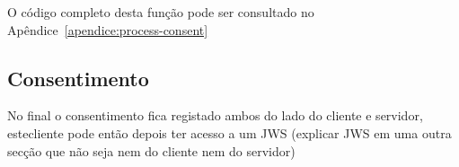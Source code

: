 O código completo desta função pode ser consultado no Apêndice~\ref{apendice:process-consent}

\subsection{Consentimento}

No final o consentimento fica registado ambos do lado do cliente e servidor, estecliente pode então depois ter acesso a um JWS (explicar JWS em uma outra secção que não seja nem do cliente nem do servidor)
